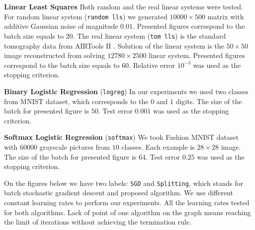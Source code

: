 \documentclass{article}
\begin{document}
\textbf{Linear Least Squares}  Both random and the real linear systems were tested. For random linear system (\texttt{random lls}) we generated $10000\times500$ matrix with additive Gaussian noise of magnitude $0.01$. Presented figures correspond to the batch size equals to $20$. The real linear system (\texttt{tom lls}) is the standard tomography data from AIRTools II \cite{hansen2018air}. Solution of the linear system is the $50 \times 50$ image reconstructed from solving $12780 \times 2500$ linear system. Presented figures correspond to the batch size equals to $60$. Relative error $10^{-3}$ was used as the stopping criterion.

\textbf{Binary Logistic Regression}  (\texttt{logreg}) In our experiments we used two classes from MNIST \cite{lecun1998gradient} dataset, which corresponds to the $0$ and $1$ digits. The size of the batch for presented figure is $50$. Test error $0.001$ was used as the stopping criterion.

\textbf{Softmax Logistic Regression} (\texttt{softmax}) We took Fashion MNIST \cite{xiao2017fashion} dataset with $60000$ grayscale pictures from $10$ classes. Each example is $28 \times 28$ image. The size of the batch for presented figure is $64$. Test error $0.25$ was used as the stopping criterion.

On the figures below we have two labels: \texttt{SGD} and \texttt{Splitting}, which stands for batch stochastic gradient descent and proposed algorithm. We use different constant learning rates to perform our experiments. All the learning rates tested for both algorithms. Lack of point of one algorithm on the graph means reaching the limit of iterations without achieving the termination rule.
\end{document}
